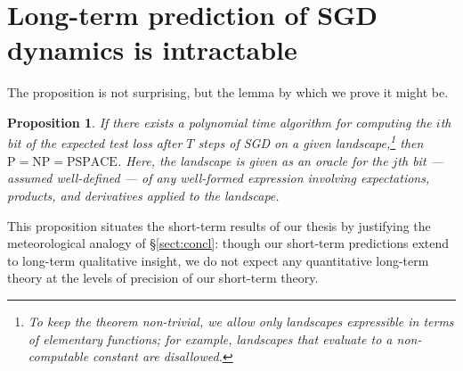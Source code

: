 \documentclass[openany, notitlepage, justified]{tufte-book}
\theoremstyle{plain}
\newtheorem{prop}{Proposition}
\theoremstyle{definition}
\begin{document}
    \section{Long-term prediction of SGD dynamics is intractable} \label{appendix:pspace}
        The proposition is not surprising, but the lemma by which we prove it
        might be.
        \begin{prop} \label{prop:pspace}
            If there exists a polynomial time algorithm for computing the $i$th
            bit of the expected test loss after $T$ steps of SGD on a given
            landscape,\footnote{
                To keep the theorem non-trivial, we allow only landscapes
                expressible in terms of elementary functions; for example,
                landscapes that evaluate to a non-computable constant are
                disallowed.
            } then $\text{P}=\text{NP}=\text{PSPACE}$.  Here, the landscape is
            given as an oracle for the $j$th bit 
            --- assumed well-defined --- of any well-formed expression
            involving expectations, products, and derivatives applied to the
            landscape.
        \end{prop}
        This proposition situates the short-term results of
        our thesis by justifying the meteorological analogy of
        \S\ref{sect:concl}: though our short-term predictions extend to
        long-term qualitative insight, we do not expect any quantitative
        long-term theory at the levels of precision of our short-term theory.
\end{document}
